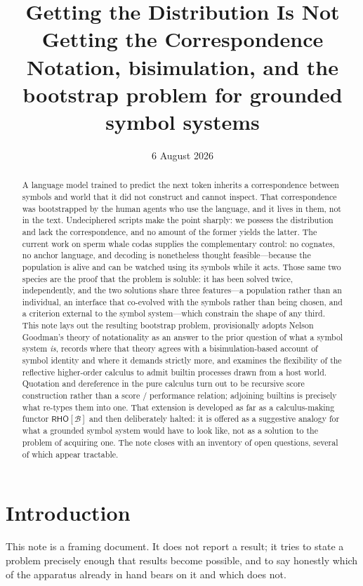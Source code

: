 \documentclass[11pt,a4paper]{article}
\title{\textbf{Getting the Distribution Is Not Getting the Correspondence}\\[0.4em]
\large Notation, bisimulation, and the bootstrap problem for grounded symbol systems}
\author{}
\date{6 August 2026}
\theoremstyle{definition}
\theoremstyle{plain}
\theoremstyle{remark}
\newcommand{\RHO}{\mathsf{RHO}}
\newcommand{\Bee}{\mathcal{B}}
\begin{document}
\maketitle

\begin{abstract}
\noindent A language model trained to predict the next token inherits a correspondence
between symbols and world that it did not construct and cannot inspect. That
correspondence was bootstrapped by the human agents who use the language, and it lives
in them, not in the text. Undeciphered scripts make the point sharply: we possess the
distribution and lack the correspondence, and no amount of the former yields the latter.
The current work on sperm whale codas supplies the complementary control: no cognates, no
anchor language, and decoding is nonetheless thought feasible---because the population is
alive and can be watched using its symbols while it acts. Those same two species are the
proof that the problem is soluble: it has been solved twice, independently, and the two
solutions share three features---a population rather than an individual, an interface that
co-evolved with the symbols rather than being chosen, and a criterion external to the
symbol system---which constrain the shape of any third.
This note lays out the resulting bootstrap problem, provisionally adopts Nelson
Goodman's theory of notationality as an answer to the prior question of what a symbol
system \emph{is}, records where that theory agrees with a bisimulation-based account of
symbol identity and where it demands strictly more, and examines the flexibility of the
reflective higher-order calculus to admit builtin processes drawn from a host world.
Quotation and dereference in the pure calculus turn out to be recursive score
construction rather than a score / performance relation; adjoining builtins is precisely
what re-types them into one. That extension is developed as far as a calculus-making
functor $\RHO[\Bee]$ and then
deliberately halted: it is offered as a suggestive analogy for what a grounded symbol
system would have to look like, not as a solution to the problem of acquiring one. The
note closes with an inventory of open questions, several of which appear tractable.
\end{abstract}

\section{Introduction}

This note is a framing document. It does not report a result; it tries to state a
problem precisely enough that results become possible, and to say honestly which of the
apparatus already in hand bears on it and which does not.
\end{document}
